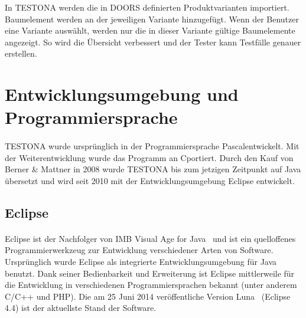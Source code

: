 In TESTONA werden  die in DOORS definierten Produktvarianten importiert. Baumelement werden an der jeweiligen Variante hinzugefügt. Wenn der Benutzer eine Variante auswählt, werden nur die in dieser Variante gültige Baumelemente angezeigt. So wird die Übersicht verbessert und der Tester kann Testfälle genauer erstellen.




\newpage
\section{Entwicklungsumgebung und Programmiersprache}
\paragraph{}
TESTONA wurde ursprünglich in der Programmiersprache \glqq Pascal\grqq entwickelt. Mit der Weiterentwicklung wurde das Programm an \glqq C\grqq portiert. Durch den Kauf von Berner \& Mattner in 2008 wurde TESTONA bis zum jetzigen Zeitpunkt auf Java übersetzt und wird seit 2010 mit der Entwicklungsumgebung Eclipse entwickelt.

\subsection{Eclipse}
\paragraph{}
Eclipse ist der Nachfolger von \glqq IMB Visual Age for Java\grqq~ und ist ein quelloffenes Programmierwerkzeug zur Entwicklung verschiedener Arten von Software. Ursprünglich wurde Eclipse als integrierte Entwicklungsumgebung für Java benutzt. Dank seiner Bedienbarkeit und Erweiterung ist Eclipse mittlerweile für die Entwicklung in verschiedenen Programmiersprachen bekannt (unter anderem C/C++ und PHP). Die am 25 Juni 2014 veröffentliche Version \glqq Luna\grqq~ (Eclipse 4.4) ist der aktuellste Stand der Software. \\

